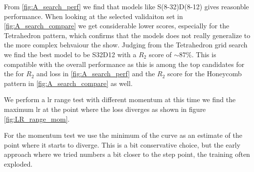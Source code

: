 From \cref{fig:A_search_perf} we find that models like S(8-32)D(8-12) gives reasonble performance. When looking at the selected validaiton set in
\cref{fig:A_search_compare} we get considerable lower scores, especially for
the Tetrahedron pattern, which confirms that the models does not really generalize to the more complex behvaiour the show. Judging from the Tetrahedron grid search we find the best model to be S32D12 with a $R_2$ score of $\sim 87 \%$. This is compatible with the overall performance as this is among the top candidates for the for $R_2$ and loss in \cref{fig:A_search_perf} and the $R_2$ score for the Honeycomb pattern in \cref{fig:A_search_compare}  as well.


We perform a lr range test with different momentum at this time we find the
maximum lr at the point where the loss diverges as shown in figure
\cref{fig:LR_range_mom}.


For the momentum test we use the minimum of the curve as an estimate of the point where it starts to diverge. This is a bit conservative choice, but the early approach where we tried numbers a bit closer to the step point, the training often exploded. 

